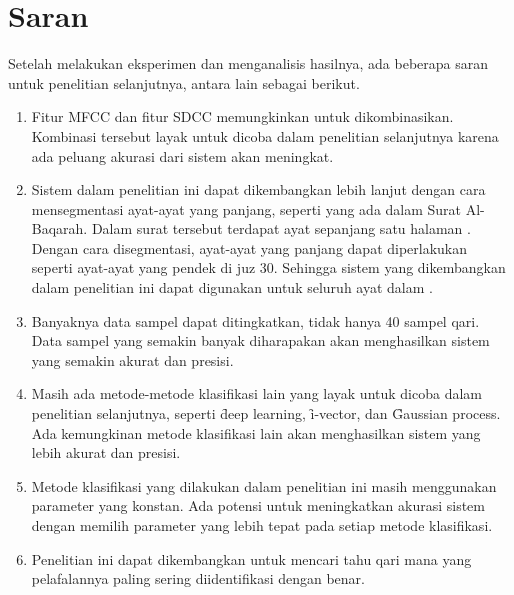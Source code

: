 \section{Saran}
Setelah melakukan eksperimen dan menganalisis hasilnya, ada beberapa saran untuk penelitian selanjutnya, antara lain sebagai berikut.

\begin{enumerate}
  \item Fitur MFCC dan fitur SDCC memungkinkan untuk dikombinasikan. Kombinasi tersebut layak untuk dicoba dalam penelitian selanjutnya karena ada peluang akurasi dari sistem akan meningkat.

  \item Sistem dalam penelitian ini dapat dikembangkan lebih lanjut dengan cara mensegmentasi ayat-ayat yang panjang, seperti yang ada dalam Surat Al-Baqarah. Dalam surat tersebut terdapat ayat sepanjang satu halaman \quran. Dengan cara disegmentasi, ayat-ayat yang panjang dapat diperlakukan seperti ayat-ayat yang pendek di juz 30. Sehingga sistem yang dikembangkan dalam penelitian ini dapat digunakan untuk seluruh ayat dalam \quran.

  \item Banyaknya data sampel dapat ditingkatkan, tidak hanya 40 sampel qari. Data sampel yang semakin banyak diharapakan akan menghasilkan sistem yang semakin akurat dan presisi.

  \item Masih ada metode-metode klasifikasi lain yang layak untuk dicoba dalam penelitian selanjutnya, seperti \f{deep learning}, \f{i-vector}, dan \f{Gaussian process}. Ada kemungkinan metode klasifikasi lain akan menghasilkan sistem yang lebih akurat dan presisi.

  \item Metode klasifikasi yang dilakukan dalam penelitian ini masih menggunakan parameter yang konstan. Ada potensi untuk meningkatkan akurasi sistem dengan memilih parameter yang lebih tepat pada setiap metode klasifikasi.

  \item Penelitian ini dapat dikembangkan untuk mencari tahu qari mana yang pelafalannya paling sering diidentifikasi dengan benar.
\end{enumerate}